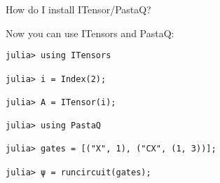 \begin{frame}[fragile]{How do I install ITensor/PastaQ?}

Now you can use ITensors and PastaQ:
\begin{lstlisting}[language=JuliaLocal, numbers=none, style=julia, basicstyle=\small]
julia> using ITensors

julia> i = Index(2);

julia> A = ITensor(i);

julia> using PastaQ

julia> gates = [("X", 1), ("CX", (1, 3))];

julia> ψ = runcircuit(gates);
\end{lstlisting}

\end{frame}
